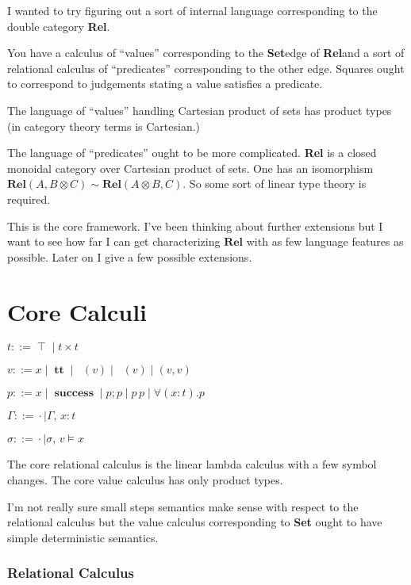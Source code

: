 \documentclass[twocolumn]{scrartcl}
\newcommand{\Rel}{\textbf{Rel}}
\newcommand{\Set}{\textbf{Set}}
\newcommand{\bnfdef}{\mathrel{::=}}
\DeclareMathOperator{\unit}{\top}
\DeclareMathOperator{\coin}{\textbf{tt}}
\DeclareMathOperator{\fst}{\pi_1}
\DeclareMathOperator{\snd}{\pi_2}
\DeclareMathOperator{\success}{\textbf{success}}
\newcommand{\pass}{;}
\begin{document}
I wanted to try figuring out a sort of internal language corresponding
to the double category \Rel.

You have a calculus of ``values'' corresponding to the \Set edge of
\Rel and a sort of relational calculus of ``predicates'' corresponding
to the other edge. Squares ought to correspond to judgements stating a
value satisfies a predicate.

The language of ``values'' handling Cartesian product of sets has
product types (in category theory terms is Cartesian.)

The language of ``predicates'' ought to be more complicated. \Rel
is a closed monoidal category over Cartesian product of sets.  One has
an isomorphism \( \Rel(A, B \otimes C) \sim \Rel (A \otimes B, C) \).
So some sort of linear type theory is required.

This is the core framework.  I've been thinking about further
extensions but I want to see how far I can get characterizing
\(\Rel\) with as few language features as possible.  Later on I
give a few possible extensions.

\section*{Core Calculi}

\begin{description}[nosep]
\item[Types] \hfill \( t \bnfdef \unit \mid t \times t \)
\item[Values] \hfill \( v \bnfdef x \mid \coin \mid \fst(v) \mid \snd(v) \mid ( v , v ) \)
\item[Predicates] \hfill \( p \bnfdef x \mid \success \mid p \pass p \mid p \, p \mid \forall (x \colon t) . p \)
\item[Environment] \hfill \( \Gamma \bnfdef \cdot \mid \Gamma , \, x \colon t  \)
\item[Substitutions] \hfill \( \sigma \bnfdef \cdot \mid \sigma , \, v \models x  \)
\end{description}

The core relational calculus is the linear lambda calculus with a few
symbol changes.  The core value calculus has only product types.

I'm not really sure small steps semantics make sense with respect to
the relational calculus but the value calculus corresponding to \Set
ought to have simple deterministic semantics.

\subsubsection*{Relational Calculus}
\end{document}
